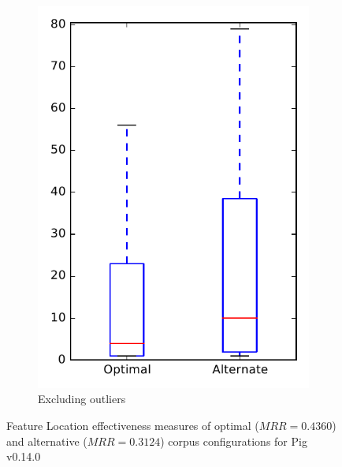 \begin{figure}
\begin{subfigure}{.4\textwidth}
        \includegraphics[height=0.4\textheight]{figures/combo/flt_rq2_pig_no_outlier}
        \caption{Excluding outliers}\label{fig:combo:flt:rq2:pig_no_outlier}
    \end{subfigure}
\caption{Feature Location effectiveness measures of optimal ($MRR=0.4360$) and alternative ($MRR=0.3124$) corpus configurations for Pig v0.14.0}
\label{fig:combo:flt:rq2:pig}
\end{figure}
